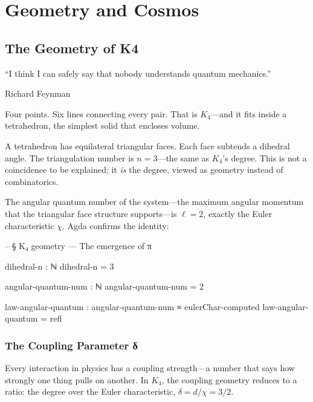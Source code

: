 \documentclass[11pt,a4paper]{book}
\def\texorpdfstring#1#2{#2}%
\begin{document}
\part{Geometry and Cosmos}

\chapter{The Geometry of K\texorpdfstring{$_4$}{4}}
\label{ch:geometry}

\epigraph{``I think I can safely say that nobody understands quantum mechanics.''}{Richard Feynman}

Four points. Six lines connecting every pair. That is $K_4$---and it fits inside a tetrahedron, the simplest solid that encloses volume.

A tetrahedron has equilateral triangular faces. Each face subtends a dihedral angle. The triangulation number is $n = 3$---the same as $K_4$'s degree. This is not a coincidence to be explained; it \emph{is} the degree, viewed as geometry instead of combinatorics.

The angular quantum number of the system---the maximum angular momentum that the triangular face structure supports---is $\ell = 2$, exactly the Euler characteristic $\chi$. Agda confirms the identity:

\begin{code}
-- § K₄ geometry — The emergence of π

dihedral-n : ℕ
dihedral-n = 3

angular-quantum-num : ℕ
angular-quantum-num = 2

law-angular-quantum : angular-quantum-num ≡ eulerChar-computed
law-angular-quantum = refl
\end{code}

\section{The Coupling Parameter \texorpdfstring{$\delta$}{δ}}

Every interaction in physics has a coupling strength---a number that says how strongly one thing pulls on another. In $K_4$, the coupling geometry reduces to a ratio: the degree over the Euler characteristic, $\delta = d/\chi = 3/2$.
\end{document}
